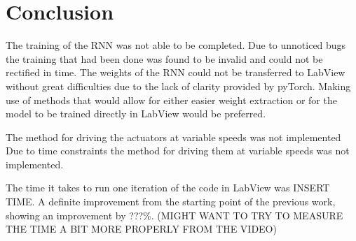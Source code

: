 \section{Conclusion}
\blindtext

The training of the RNN was not able to be completed.
Due to unnoticed bugs the training that had been done was found to be invalid and could not be rectified in time.
The
weights of the RNN could not be transferred to LabView without great difficulties due to the lack of clarity provided by
pyTorch.
Making use of methods that would allow for either easier weight extraction or for the model to be trained
directly in LabView would be preferred.


The method for driving the actuators at variable speeds was not implemented
Due to time constraints the method for driving them at variable speeds was not implemented.


The time it takes to run one iteration of the code in LabView was INSERT TIME.
A definite improvement from the starting point of the previous work, showing an improvement by ???\%. (MIGHT WANT TO TRY TO MEASURE THE TIME A BIT MORE
PROPERLY FROM THE VIDEO)


